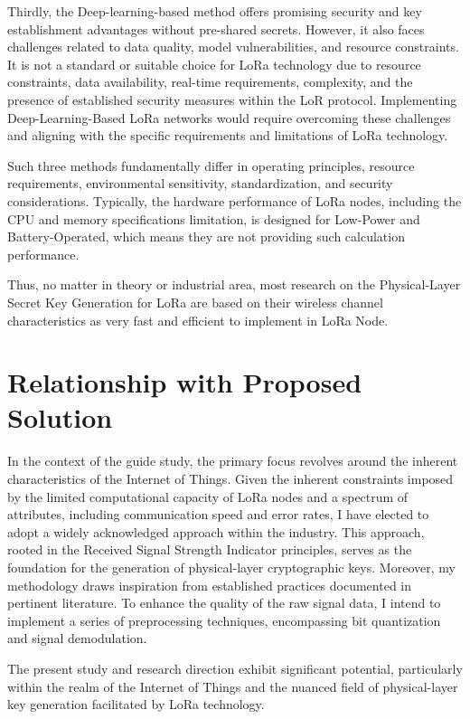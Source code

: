 Thirdly, the Deep-learning-based method offers promising security and key establishment advantages without pre-shared secrets. However, it also faces challenges related to data quality, model vulnerabilities, and resource constraints. It is not a standard or suitable choice for LoRa technology due to resource constraints, data availability, real-time requirements, complexity, and the presence of established security measures within the LoR protocol. Implementing Deep-Learning-Based LoRa networks would require overcoming these challenges and aligning with the specific requirements and limitations of LoRa technology.

Such three methods fundamentally differ in operating principles, resource requirements, environmental sensitivity, standardization, and security considerations. Typically, the hardware performance of LoRa nodes, including the CPU and memory specifications limitation, is designed for Low-Power and Battery-Operated, which means they are not providing such calculation performance.

Thus, no matter in theory or industrial area, most research on the Physical-Layer Secret Key Generation for LoRa are based on their wireless channel characteristics as very fast and efficient to implement in LoRa Node.

\section{Relationship with Proposed Solution}
In the context of the guide study, the primary focus revolves around the inherent characteristics of the Internet of Things. Given the inherent constraints imposed by the limited computational capacity of LoRa nodes and a spectrum of attributes, including communication speed and error rates, I have elected to adopt a widely acknowledged approach within the industry. This approach, rooted in the Received Signal Strength Indicator principles, serves as the foundation for the generation of physical-layer cryptographic keys. Moreover, my methodology draws inspiration from established practices documented in pertinent literature. To enhance the quality of the raw signal data, I intend to implement a series of preprocessing techniques, encompassing bit quantization and signal demodulation.

The present study and research direction exhibit significant potential, particularly within the realm of the Internet of Things and the nuanced field of physical-layer key generation facilitated by LoRa technology. 

